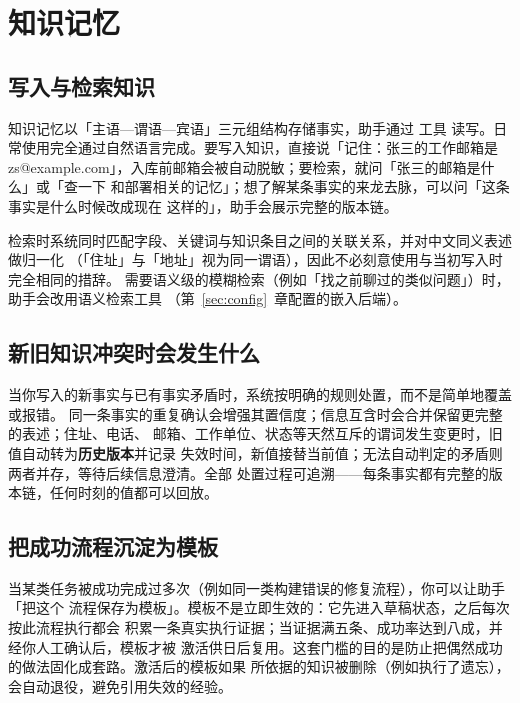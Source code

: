 \section{知识记忆}\label{sec:knowledge}

\subsection{写入与检索知识}

知识记忆以「主语—谓语—宾语」三元组结构存储事实，助手通过  工具
读写。日常使用完全通过自然语言完成。要写入知识，直接说「记住：张三的工作邮箱是
zs@example.com」，入库前邮箱会被自动脱敏；要检索，就问「张三的邮箱是什么」或「查一下
和部署相关的记忆」；想了解某条事实的来龙去脉，可以问「这条事实是什么时候改成现在
这样的」，助手会展示完整的版本链。

检索时系统同时匹配字段、关键词与知识条目之间的关联关系，并对中文同义表述做归一化
（「住址」与「地址」视为同一谓语），因此不必刻意使用与当初写入时完全相同的措辞。
需要语义级的模糊检索（例如「找之前聊过的类似问题」）时，助手会改用语义检索工具
（第~\ref{sec:config}~章配置的嵌入后端）。

\subsection{新旧知识冲突时会发生什么}

当你写入的新事实与已有事实矛盾时，系统按明确的规则处置，而不是简单地覆盖或报错。
同一条事实的重复确认会增强其置信度；信息互含时会合并保留更完整的表述；住址、电话、
邮箱、工作单位、状态等天然互斥的谓词发生变更时，旧值自动转为\textbf{历史版本}并记录
失效时间，新值接替当前值；无法自动判定的矛盾则两者并存，等待后续信息澄清。全部
处置过程可追溯——每条事实都有完整的版本链，任何时刻的值都可以回放。

\subsection{把成功流程沉淀为模板}

当某类任务被成功完成过多次（例如同一类构建错误的修复流程），你可以让助手「把这个
流程保存为模板」。模板不是立即生效的：它先进入草稿状态，之后每次按此流程执行都会
积累一条真实执行证据；当证据满五条、成功率达到八成，并经你人工确认后，模板才被
激活供日后复用。这套门槛的目的是防止把偶然成功的做法固化成套路。激活后的模板如果
所依据的知识被删除（例如执行了遗忘），会自动退役，避免引用失效的经验。
